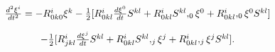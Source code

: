 \begin{equation}
\begin{array}{c}
\frac{d^{2}\xi^{i}}{dt^{2}}=-R_{0k0}^{i}\xi^{k}-\frac{1}{2}[R_{0kl}^{i}\frac{%
d\xi^{0}}{dt}S^{kl}+R_{0kl}^{i}S^{kl},_{0}\xi^{0}+R_{0kl}^{i},_{0}%
\xi^{0}S^{kl}] \\ 
\\ 
-\frac{1}{2}[R_{jkl}^{i}\frac{d\xi^{j}}{dt}S^{kl}+R_{0kl}^{i}S^{kl},_{j}%
\xi^{j}+R_{0kl}^{i},_{j}\xi^{j}S^{kl}].
\end{array}
\label{41}
\end{equation}

